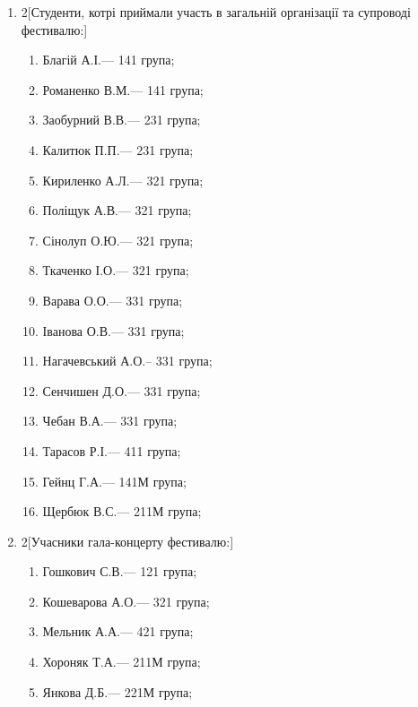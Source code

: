 \documentclass[
	a4paper,
	12pt,
	oneside,
	draft
]{extreport}
\begin{document}
\begin{enumerate}[topsep=0pt,itemsep=-1ex,partopsep=1ex,parsep=1ex]
\item 
\begin{multicols}{2}[Студенти, котрі приймали участь в загальній організації та супроводі фестивалю:] 
\begin{enumerate}[topsep=0pt,itemsep=-1ex,partopsep=1ex,parsep=1ex,label=\arabic*.]
\item Благій А.І.\hfill --- 141 група;
\item Романенко В.М.\hfill --- 141 група;
\item Заобурний В.В.\hfill --- 231 група;
\item Калитюк П.П.\hfill --- 231 група;
\item Кириленко А.Л.\hfill --- 321 група;
\item Поліщук А.В.\hfill --- 321 група;
\item Сінолуп О.Ю.\hfill --- 321 група;
\item Ткаченко І.О.\hfill --- 321 група;
\item Варава О.О.\hfill --- 331 група;
\item Іванова О.В.\hfill --- 331 група;
\item Нагачевський А.О.\hfill -- 331 група;
\item Сенчишен Д.О.\hfill --- 331 група;
\item Чебан В.А.\hfill --- 331 група;
\item Тарасов Р.І.\hfill --- 411 група;
\item Гейнц Г.А.\hfill --- 141М група;
\item Щербюк В.С.\hfill --- 211М група;
\end{enumerate}
\end{multicols}

\item 
\begin{multicols}{2}[Учасники гала-концерту фестивалю:] 
\begin{enumerate}[topsep=0pt,itemsep=-1ex,partopsep=1ex,parsep=1ex,label=\arabic*.]
\item Гошкович С.В.\hfill --- 121 група;
\item Кошеварова А.О.\hfill --- 321 група;
\item Мельник А.А.\hfill --- 421 група;
\item Хороняк Т.А.\hfill --- 211М група;
\item Янкова Д.Б.\hfill --- 221М група;
\end{enumerate}
\end{multicols}


\end{enumerate}
\end{document}
